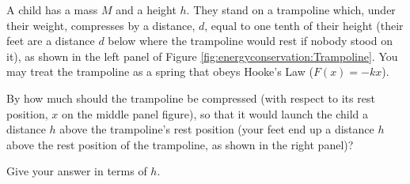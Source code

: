 \question A child has a mass $M$ and a height $h$. They stand on a trampoline which, under their weight, compresses by a distance, $d$, equal to one tenth of their height (their feet are a distance $d$ below where the trampoline would rest if nobody stood on it), as shown in the left panel of Figure \ref{fig:energyconservation:Trampoline}. You may treat the trampoline as a spring that obeys Hooke's Law ($F(x)=-kx$).

By how much should the trampoline be compressed (with respect to its rest position, $x$ on the middle panel figure), so that it would launch the child a distance $h$ above the trampoline's rest position (your feet end up a distance $h$ above the rest position of the trampoline, as shown in the right panel)?

Give your answer in terms of $h$.

